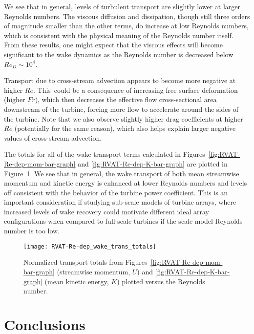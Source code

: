 We see that in general, levels of turbulent transport are slightly lower at
larger Reynolds numbers. The viscous diffusion and dissipation, though still
three orders of magnitude smaller than the other terms, do increase at low
Reynolds numbers, which is consistent with the physical meaning of the Reynolds
number itself. From these results, one might expect that the viscous effects
will become significant to the wake dynamics as the Reynolds number is decreased
below $Re_D \sim 10^4$.

Transport due to cross-stream advection appears to become more negative at
higher $Re$. This~could be a consequence of increasing free surface deformation
(higher $Fr$), which then decreases the effective flow cross-sectional area
downstream of the turbine, forcing more flow to accelerate around the sides of
the turbine. Note that we also observe slightly higher drag coefficients at
higher $Re$ (potentially for the same reason), which also helps explain larger
negative values of cross-stream advection.

The totals for all of the wake transport terms calculated in
Figures~\ref{fig:RVAT-Re-dep-mom-bar-graph} and \ref{fig:RVAT-Re-dep-K-bar-graph} are plotted in
Figure~\ref{fig:RVAT-Re-dep-wake-trans-totals}. We see that in general, the wake
transport of both mean streamwise momentum and kinetic energy is enhanced at
lower Reynolds numbers and levels off consistent with the behavior of the
turbine power coefficient. This is an important consideration if studying
sub-scale models of turbine arrays, where increased levels of wake recovery
could motivate different ideal array configurations when compared to full-scale
turbines if the scale model Reynolds number is too low.

\begin{figure}
    \centering
    
    \texttt{[image: RVAT-Re-dep\_wake\_trans\_totals]}
    
    \caption{Normalized transport totals from Figures~\ref{fig:RVAT-Re-dep-mom-bar-graph}
        (streamwise momentum, $U$) and \ref{fig:RVAT-Re-dep-K-bar-graph} (mean kinetic energy,
        $K$) plotted versus the Reynolds number.}
    
    \label{fig:RVAT-Re-dep-wake-trans-totals}
\end{figure}



\section{Conclusions}


